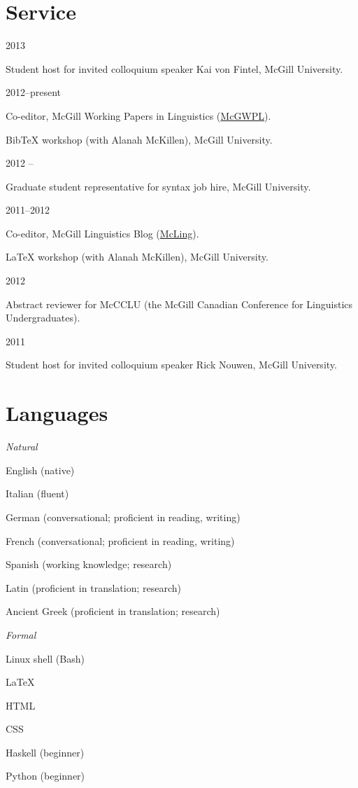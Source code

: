 \documentclass[11pt,letterpaper]{article}
\newcommand{\cvitem}[2]{%
  \begin{minipage}[t]{0.24\textwidth}
    #1 %
  \end{minipage}
  \hfill
  \begin{minipage}[t]{0.74\textwidth}
    #2 %
  \end{minipage}
}
\renewenvironment{itemize}{%
  \begin{list}{}{%
    \setlength{\itemsep}{0.5em}
    \setlength{\leftmargin}{0em}
  }
}{%
  \end{list}
}
\begin{document}
\section*{Service}

\cvitem{2013 \shortmonthname[1]}{Student host for invited colloquium speaker
Kai von Fintel, McGill University.}

\cvitem{2012--present}{Co-editor, McGill Working Papers in Linguistics
(\href{http://www.mcgill.ca/mcgwpl/}{McGWPL}).}

\cvitem{}{Bib\TeX{} workshop (with Alanah McKillen),
McGill University.}

\cvitem{2012 \shortmonthname[5]--\shortmonthname[6]}{Graduate student
representative for syntax job hire, McGill University.}

\cvitem{2011--2012}{Co-editor, McGill Linguistics Blog
(\href{https://blogs.mcgill.ca/mcling/}{McLing}).}

\cvitem{}{\LaTeX{} workshop (with Alanah McKillen),
McGill University.}

\cvitem{2012 \shortmonthname[1]}{Abstract reviewer for McCCLU (the McGill
Canadian Conference for Linguistics Undergraduates).}

\cvitem{2011 \shortmonthname[12]}{Student host for invited colloquium speaker
Rick Nouwen, McGill University.}



\section*{Languages}

\cvitem{\textit{Natural}}{%
  \begin{itemize}
    \item English \hfill (native)
    \item Italian \hfill (fluent)
    \item German \hfill (conversational; proficient in reading, writing)
    \item French \hfill (conversational; proficient in reading, writing)
    \item Spanish \hfill (working knowledge; research)
    \item Latin \hfill (proficient in translation; research)
    \item Ancient Greek \hfill (proficient in translation; research)
  \end{itemize}
}

\cvitem{\textit{Formal}}{%
  \begin{itemize}
    \item Linux shell (Bash)
    \item \LaTeX{}
    \item HTML
    \item CSS
    \item Haskell \hfill (beginner)
    \item Python \hfill (beginner)
  \end{itemize}
}
\end{document}
